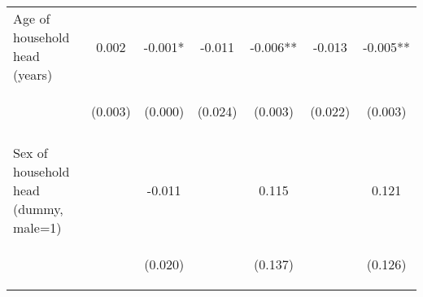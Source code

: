 \begin{center}
\begin{tabular}{lcccccc}
Age of household head (years) & 0.002 & -0.001* & -0.011 & -0.006** & -0.013 & -0.005** \\
 & \begin{footnotesize}(0.003)\end{footnotesize} & \begin{footnotesize}(0.000)\end{footnotesize} & \begin{footnotesize}(0.024)\end{footnotesize} & \begin{footnotesize}(0.003)\end{footnotesize} & \begin{footnotesize}(0.022)\end{footnotesize} & \begin{footnotesize}(0.003)\end{footnotesize} \\
\vspace{4pt} & \begin{footnotesize}[0.545]\end{footnotesize} & \begin{footnotesize}[0.066]\end{footnotesize} & \begin{footnotesize}[0.649]\end{footnotesize} & \begin{footnotesize}[0.043]\end{footnotesize} & \begin{footnotesize}[0.554]\end{footnotesize} & \begin{footnotesize}[0.040]\end{footnotesize} \\
Sex of household head (dummy, male=1) &  & -0.011 &  & 0.115 &  & 0.121 \\
 & \begin{footnotesize}\end{footnotesize} & \begin{footnotesize}(0.020)\end{footnotesize} & \begin{footnotesize}\end{footnotesize} & \begin{footnotesize}(0.137)\end{footnotesize} & \begin{footnotesize}\end{footnotesize} & \begin{footnotesize}(0.126)\end{footnotesize} \\

\end{tabular}
\end{center}
